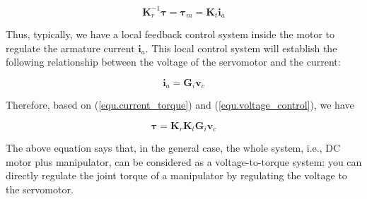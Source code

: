 \documentclass[10pt]{article}
\begin{document}
\begin{equation}\label{equ.current_torque}
    \boldsymbol{K}_r^{-1}\boldsymbol{\tau}= \boldsymbol{\tau}_m =\boldsymbol{K}_{t} \boldsymbol{i}_{a}
\end{equation}

Thus, typically, we have a local feedback control system inside the motor to regulate the armature current $\boldsymbol{i}_a$. This local control system will establish the following relationship between the voltage of the servomotor and the current:

\begin{equation}\label{equ.voltage_current}
    \boldsymbol{i}_{a}=\boldsymbol{G}_{i} \boldsymbol{v}_{c}
\end{equation}

Therefore, based on (\ref{equ.current_torque}) and (\ref{equ.voltage_control}), we have


\begin{equation}\label{equ.voltage_current}
    \boldsymbol{\tau}=\boldsymbol{K}_r\boldsymbol{K}_{t}\boldsymbol{G}_{i} \boldsymbol{v}_{c}
\end{equation}

The above equation says that, in the general case,  the whole system, i.e., DC motor plus manipulator, can be considered as a voltage-to-torque system: you can directly regulate  the joint torque of a manipulator by regulating the voltage to the servomotor. 
\end{document}
